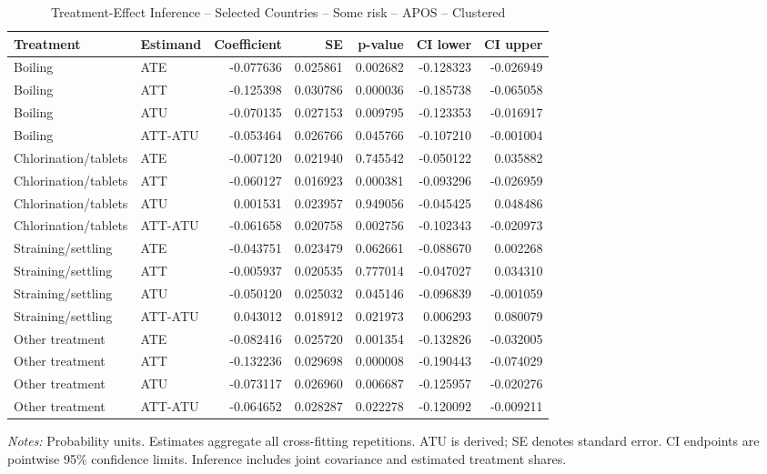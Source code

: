 \begin{table}[htbp]
\centering
\caption{Treatment-Effect Inference -- Selected Countries -- Some risk -- APOS -- Clustered}
\label{tab:inference-SomeRiskHome-APOS-selected-countries}
\scriptsize
\begin{adjustbox}{max width=\linewidth}
\begin{tabular}{llrrrrr}
\toprule
Treatment & Estimand & Coefficient & SE & p-value & CI lower & CI upper \\
\midrule
Boiling & ATE & -0.077636 & 0.025861 & 0.002682 & -0.128323 & -0.026949 \\
Boiling & ATT & -0.125398 & 0.030786 & 0.000036 & -0.185738 & -0.065058 \\
Boiling & ATU & -0.070135 & 0.027153 & 0.009795 & -0.123353 & -0.016917 \\
Boiling & ATT-ATU & -0.053464 & 0.026766 & 0.045766 & -0.107210 & -0.001004 \\
Chlorination/tablets & ATE & -0.007120 & 0.021940 & 0.745542 & -0.050122 & 0.035882 \\
Chlorination/tablets & ATT & -0.060127 & 0.016923 & 0.000381 & -0.093296 & -0.026959 \\
Chlorination/tablets & ATU & 0.001531 & 0.023957 & 0.949056 & -0.045425 & 0.048486 \\
Chlorination/tablets & ATT-ATU & -0.061658 & 0.020758 & 0.002756 & -0.102343 & -0.020973 \\
Straining/settling & ATE & -0.043751 & 0.023479 & 0.062661 & -0.088670 & 0.002268 \\
Straining/settling & ATT & -0.005937 & 0.020535 & 0.777014 & -0.047027 & 0.034310 \\
Straining/settling & ATU & -0.050120 & 0.025032 & 0.045146 & -0.096839 & -0.001059 \\
Straining/settling & ATT-ATU & 0.043012 & 0.018912 & 0.021973 & 0.006293 & 0.080079 \\
Other treatment & ATE & -0.082416 & 0.025720 & 0.001354 & -0.132826 & -0.032005 \\
Other treatment & ATT & -0.132236 & 0.029698 & 0.000008 & -0.190443 & -0.074029 \\
Other treatment & ATU & -0.073117 & 0.026960 & 0.006687 & -0.125957 & -0.020276 \\
Other treatment & ATT-ATU & -0.064652 & 0.028287 & 0.022278 & -0.120092 & -0.009211 \\
\bottomrule
\end{tabular}

\end{adjustbox}
\par\smallskip
\begin{minipage}{\linewidth}\scriptsize \textit{Notes:} Probability units. Estimates aggregate all cross-fitting repetitions. ATU is derived; SE denotes standard error. CI endpoints are pointwise 95\% confidence limits. Inference includes joint covariance and estimated treatment shares. \end{minipage}
\end{table}

